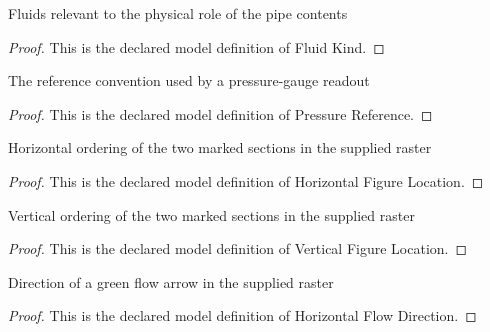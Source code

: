 \begin{definition}
  \label{def:physics:phyx-mini-0724:phyxminiproblems-problemphyxmini0724-fluidkind}
  Fluids relevant to the physical role of the pipe contents
\end{definition}
\begin{proof}
  This is the declared model definition of Fluid Kind.
\end{proof}
\begin{definition}
  \label{def:physics:phyx-mini-0724:phyxminiproblems-problemphyxmini0724-pressurereference}
  The reference convention used by a pressure-gauge readout
\end{definition}
\begin{proof}
  This is the declared model definition of Pressure Reference.
\end{proof}
\begin{definition}
  \label{def:physics:phyx-mini-0724:phyxminiproblems-problemphyxmini0724-horizontalfigurelocation}
  Horizontal ordering of the two marked sections in the supplied raster
\end{definition}
\begin{proof}
  This is the declared model definition of Horizontal Figure Location.
\end{proof}
\begin{definition}
  \label{def:physics:phyx-mini-0724:phyxminiproblems-problemphyxmini0724-verticalfigurelocation}
  Vertical ordering of the two marked sections in the supplied raster
\end{definition}
\begin{proof}
  This is the declared model definition of Vertical Figure Location.
\end{proof}
\begin{definition}
  \label{def:physics:phyx-mini-0724:phyxminiproblems-problemphyxmini0724-horizontalflowdirection}
  Direction of a green flow arrow in the supplied raster
\end{definition}
\begin{proof}
  This is the declared model definition of Horizontal Flow Direction.
\end{proof}

